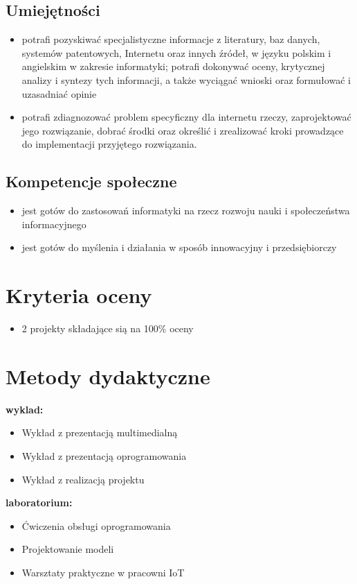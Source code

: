 \documentclass[12pt, a4paper]{article}
\begin{document}
\subsection*{Umiejętności}
\begin{itemize}
  \item potrafi pozyskiwać specjalistyczne informacje z literatury, baz danych, systemów patentowych, Internetu oraz innych źródeł, w języku polskim i angielskim w zakresie informatyki; potrafi dokonywać oceny, krytycznej analizy i syntezy tych informacji,  a także wyciągać wnioski oraz formułować i uzasadniać opinie
  \item potrafi zdiagnozować problem specyficzny dla internetu rzeczy, zaprojektować jego rozwiązanie, dobrać środki oraz określić i zrealizować kroki prowadzące do implementacji przyjętego rozwiązania.
\end{itemize}

\subsection*{Kompetencje społeczne}
\begin{itemize}
  \item jest gotów do zastosowań informatyki na rzecz rozwoju nauki i społeczeństwa informacyjnego
  \item jest gotów do myślenia i działania w sposób innowacyjny i przedsiębiorczy
\end{itemize}

\section{Kryteria oceny}

\begin{itemize}
  \item 2 projekty składające sią na 100\% oceny
\end{itemize}

\section{Metody dydaktyczne}

\textbf{wyklad:}
\begin{itemize}
  \item Wykład z prezentacją multimedialną
  \item Wykład z prezentacją oprogramowania
  \item Wykład z realizacją projektu
\end{itemize}
\vspace{4pt}
\textbf{laboratorium:}
\begin{itemize}
  \item Ćwiczenia obsługi oprogramowania
  \item Projektowanie modeli
  \item Warsztaty praktyczne w pracowni IoT
\end{itemize}
\vspace{4pt}
\end{document}
